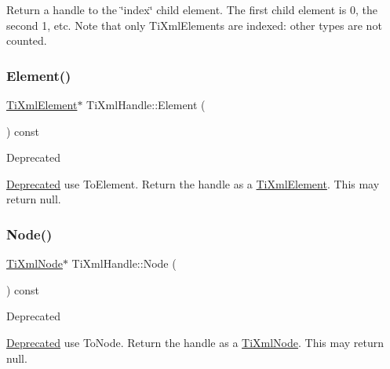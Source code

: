 Return a handle to the \char`\"{}index\char`\"{} child element. The first child element is 0, the second 1, etc. Note that only Ti\+Xml\+Elements are indexed\+: other types are not counted. \mbox{\label{class_ti_xml_handle_ae9b22d71bf5f69ee5fda28f5ad21f19c}} 
\subsubsection{\texorpdfstring{Element()}{Element()}}
{\footnotesize\ttfamily \hyperlink{class_ti_xml_element}{Ti\+Xml\+Element}$\ast$ Ti\+Xml\+Handle\+::\+Element (\begin{DoxyParamCaption}{ }\end{DoxyParamCaption}) const\hspace{0.3cm}{\ttfamily [inline]}}

\begin{DoxyRefDesc}{Deprecated}
\item[\hyperlink{deprecated__deprecated000002}{Deprecated}]use To\+Element. Return the handle as a \hyperlink{class_ti_xml_element}{Ti\+Xml\+Element}. This may return null. \end{DoxyRefDesc}
\mbox{\label{class_ti_xml_handle_aec0e3ea58ff98a45cd13507a02e2ca1e}} 
\subsubsection{\texorpdfstring{Node()}{Node()}}
{\footnotesize\ttfamily \hyperlink{class_ti_xml_node}{Ti\+Xml\+Node}$\ast$ Ti\+Xml\+Handle\+::\+Node (\begin{DoxyParamCaption}{ }\end{DoxyParamCaption}) const\hspace{0.3cm}{\ttfamily [inline]}}

\begin{DoxyRefDesc}{Deprecated}
\item[\hyperlink{deprecated__deprecated000001}{Deprecated}]use To\+Node. Return the handle as a \hyperlink{class_ti_xml_node}{Ti\+Xml\+Node}. This may return null. \end{DoxyRefDesc}
\mbox{\label{class_ti_xml_handle_ad3b502c72059421e4dfcc7bda3c392fe}} 
